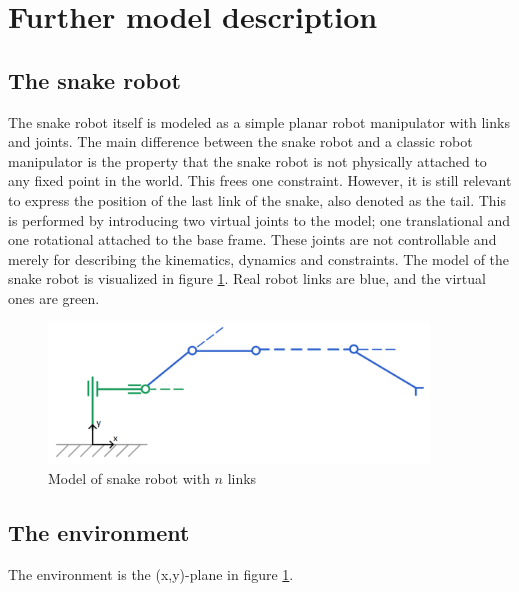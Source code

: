 
\section{Further model description}

\subsection{The snake robot}
The snake robot itself is modeled as a simple planar robot manipulator with links and joints. The main difference between the snake robot and a classic robot manipulator is the property that the snake robot is not physically attached to any fixed point in the world. This frees one constraint. However, it is still relevant to express the position of the last link of the snake, also denoted as the tail. This is performed by introducing two virtual joints to the model; one translational and one rotational attached to the base frame. These joints are not controllable and merely for describing the kinematics, dynamics and constraints. The model of the snake robot is visualized in figure \ref{fig:2_kin}. Real robot links are blue, and the virtual ones are green.

\begin{figure}
    \centering
    \includegraphics[width=0.9\textwidth]{figures/kinematics_noname.PNG}
    \caption{Model of snake robot with $n$ links}
    \label{fig:2_kin}
\end{figure}


\subsection{The environment}
The environment is the (x,y)-plane in figure \ref{fig:2_kin}.


